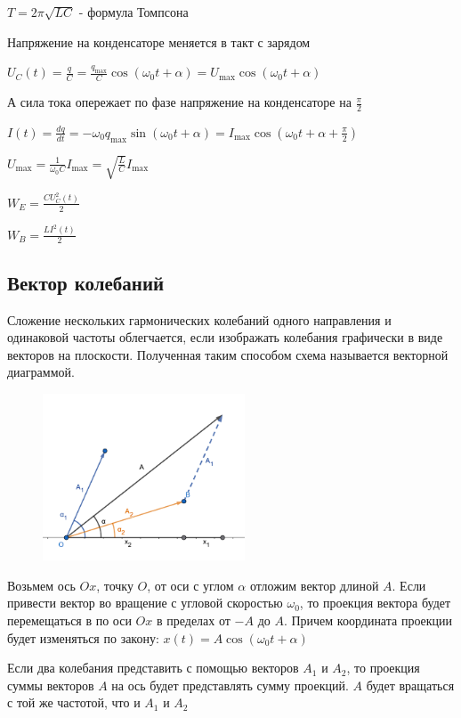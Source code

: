 \documentclass[12pt]{article}
\begin{document}
$T = 2\pi \sqrt{LC}$ - формула Томпсона

Напряжение на конденсаторе меняется в такт с зарядом

$U_C(t) = \frac{q}{C} = \frac{q_{\max}}{C} \cos (\omega_0 t + \alpha) = U_{\max} \cos (\omega_0 t + \alpha)$

А сила тока опережает по фазе напряжение на конденсаторе на $\frac{\pi}{2}$

$I(t) = \frac{dq}{dt} = -\omega_0 q_{\max} \sin(\omega_0 t + \alpha) = I_{\max} \cos(\omega_0 t + \alpha + \frac{\pi}{2})$


$U_{\max} = \frac{1}{\omega_0 C} I_{\max} = \sqrt{\frac{L}{C}} I_{\max}$

$W_E = \frac{C U^2_C (t)}{2}$

$W_B = \frac{L I^2(t)}{2}$

\subsection{Вектор колебаний}

Сложение нескольких гармонических колебаний одного направления и одинаковой частоты облегчается, 
если изображать колебания графически в виде векторов на плоскости. Полученная таким способом схема называется 
векторной диаграммой.


\begin{figure}
    \includegraphics[width=6cm]{physics2/images/physics2_2025_03_17_1}
\end{figure}

Возьмем ось $Ox$, точку $O$, от оси с углом $\alpha$ отложим вектор длиной $A$. Если привести вектор
во вращение с угловой скоростью $\omega_0$, то проекция вектора будет перемещаться в по оси $Ox$ 
в пределах от $-A$ до $A$. Причем координата проекции будет изменяться по закону: $x(t) = A\cos (\omega_0 t + \alpha)$

Если два колебания представить с помощью векторов $A_1$ и $A_2$, то проекция суммы векторов $A$ на ось будет 
представлять сумму проекций. $A$ будет вращаться с той же частотой, что и $A_1$ и $A_2$
\end{document}
